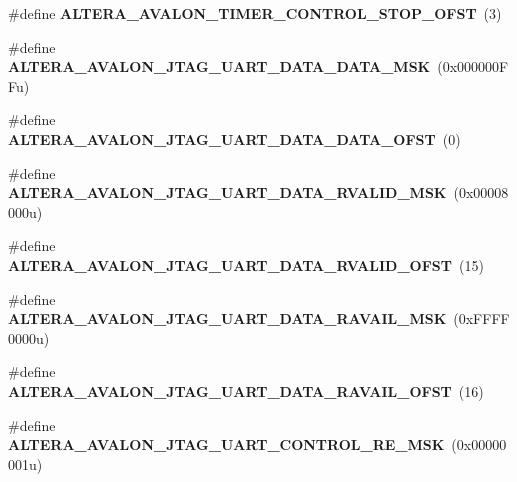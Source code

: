\begin{DoxyCompactItemize}
\#define {\bfseries A\+L\+T\+E\+R\+A\+\_\+\+A\+V\+A\+L\+O\+N\+\_\+\+T\+I\+M\+E\+R\+\_\+\+C\+O\+N\+T\+R\+O\+L\+\_\+\+S\+T\+O\+P\+\_\+\+O\+F\+ST}~(3)
\item 
\mbox{\label{group__RTEMSBSPsNios2ISS_ga05eeea63d08210946cd4b774158eb0cd}} 
\#define {\bfseries A\+L\+T\+E\+R\+A\+\_\+\+A\+V\+A\+L\+O\+N\+\_\+\+J\+T\+A\+G\+\_\+\+U\+A\+R\+T\+\_\+\+D\+A\+T\+A\+\_\+\+D\+A\+T\+A\+\_\+\+M\+SK}~(0x000000\+F\+Fu)
\item 
\mbox{\label{group__RTEMSBSPsNios2ISS_ga0e7953c4a761aba965329115f4f4954e}} 
\#define {\bfseries A\+L\+T\+E\+R\+A\+\_\+\+A\+V\+A\+L\+O\+N\+\_\+\+J\+T\+A\+G\+\_\+\+U\+A\+R\+T\+\_\+\+D\+A\+T\+A\+\_\+\+D\+A\+T\+A\+\_\+\+O\+F\+ST}~(0)
\item 
\mbox{\label{group__RTEMSBSPsNios2ISS_gaee69a3afd80a75bfe84e8a6a8957e49a}} 
\#define {\bfseries A\+L\+T\+E\+R\+A\+\_\+\+A\+V\+A\+L\+O\+N\+\_\+\+J\+T\+A\+G\+\_\+\+U\+A\+R\+T\+\_\+\+D\+A\+T\+A\+\_\+\+R\+V\+A\+L\+I\+D\+\_\+\+M\+SK}~(0x00008000u)
\item 
\mbox{\label{group__RTEMSBSPsNios2ISS_ga89bd46436d0b5890a1c7efef05c165d2}} 
\#define {\bfseries A\+L\+T\+E\+R\+A\+\_\+\+A\+V\+A\+L\+O\+N\+\_\+\+J\+T\+A\+G\+\_\+\+U\+A\+R\+T\+\_\+\+D\+A\+T\+A\+\_\+\+R\+V\+A\+L\+I\+D\+\_\+\+O\+F\+ST}~(15)
\item 
\mbox{\label{group__RTEMSBSPsNios2ISS_ga2d33c87e13b8c810805b1a6e9546062b}} 
\#define {\bfseries A\+L\+T\+E\+R\+A\+\_\+\+A\+V\+A\+L\+O\+N\+\_\+\+J\+T\+A\+G\+\_\+\+U\+A\+R\+T\+\_\+\+D\+A\+T\+A\+\_\+\+R\+A\+V\+A\+I\+L\+\_\+\+M\+SK}~(0x\+F\+F\+F\+F0000u)
\item 
\mbox{\label{group__RTEMSBSPsNios2ISS_ga0a05de54bcfedb9f4056c2096df94b68}} 
\#define {\bfseries A\+L\+T\+E\+R\+A\+\_\+\+A\+V\+A\+L\+O\+N\+\_\+\+J\+T\+A\+G\+\_\+\+U\+A\+R\+T\+\_\+\+D\+A\+T\+A\+\_\+\+R\+A\+V\+A\+I\+L\+\_\+\+O\+F\+ST}~(16)
\item 
\mbox{\label{group__RTEMSBSPsNios2ISS_gae56fa5b9a54092bea489c3b656cc465a}} 
\#define {\bfseries A\+L\+T\+E\+R\+A\+\_\+\+A\+V\+A\+L\+O\+N\+\_\+\+J\+T\+A\+G\+\_\+\+U\+A\+R\+T\+\_\+\+C\+O\+N\+T\+R\+O\+L\+\_\+\+R\+E\+\_\+\+M\+SK}~(0x00000001u)

\end{DoxyCompactItemize}
